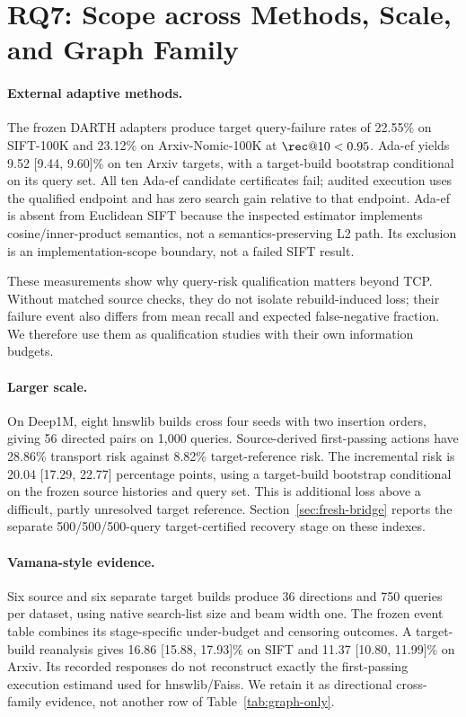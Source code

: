 \section{RQ7: Scope across Methods, Scale, and Graph Family}
\label{sec:families}

\paragraph{External adaptive methods.}
The frozen DARTH adapters produce target query-failure rates of 22.55\% on SIFT-100K and 23.12\% on Arxiv-Nomic-100K at $\rec@10<0.95$. Ada-ef yields 9.52 [9.44, 9.60]\% on ten Arxiv targets, with a target-build bootstrap conditional on its query set. All ten Ada-ef candidate certificates fail; audited execution uses the qualified endpoint and has zero search gain relative to that endpoint. Ada-ef is absent from Euclidean SIFT because the inspected estimator implements cosine/inner-product semantics, not a semantics-preserving L2 path. Its exclusion is an implementation-scope boundary, not a failed SIFT result.

These measurements show why query-risk qualification matters beyond TCP. Without matched source checks, they do not isolate rebuild-induced loss; their failure event also differs from mean recall and expected false-negative fraction. We therefore use them as qualification studies with their own information budgets.

\paragraph{Larger scale.}
On Deep1M, eight hnswlib builds cross four seeds with two insertion orders, giving 56 directed pairs on 1,000 queries. Source-derived first-passing actions have 28.86\% transport risk against 8.82\% target-reference risk. The incremental risk is 20.04 [17.29, 22.77] percentage points, using a target-build bootstrap conditional on the frozen source histories and query set. This is additional loss above a difficult, partly unresolved target reference. Section~\ref{sec:fresh-bridge} reports the separate 500/500/500-query target-certified recovery stage on these indexes.

\paragraph{Vamana-style evidence.}
Six source and six separate target builds produce 36 directions and 750 queries per dataset, using native search-list size and beam width one. The frozen event table combines its stage-specific under-budget and censoring outcomes. A target-build reanalysis gives 16.86 [15.88, 17.93]\% on SIFT and 11.37 [10.80, 11.99]\% on Arxiv. Its recorded responses do not reconstruct exactly the first-passing execution estimand used for hnswlib/Faiss. We retain it as directional cross-family evidence, not another row of Table~\ref{tab:graph-only}.

